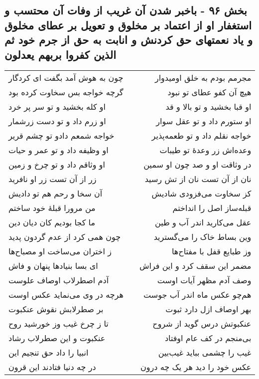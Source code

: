 \begin{center}
\section*{بخش ۹۶ - باخبر شدن آن غریب از وفات آن محتسب و استغفار او از اعتماد بر مخلوق و تعویل بر عطای مخلوق و یاد نعمتهای حق کردنش و انابت به حق از جرم خود ثم الذین کفروا بربهم یعدلون}
\label{sec:sh096}
\begin{longtable}{l p{0.5cm} r}
چون به هوش آمد بگفت ای کردگار
&&
مجرمم بودم به خلق اومیدوار
\\
گرچه خواجه بس سخاوت کرده بود
&&
هیچ آن کفو عطای تو نبود
\\
او کله بخشید و تو سر پر خرد
&&
او قبا بخشید و تو بالا و قد
\\
او زرم داد و تو دست زرشمار
&&
او ستورم داد و تو عقل سوار
\\
خواجه شمعم دادو تو چشم قریر
&&
خواجه نقلم داد و تو طعمه‌پذیر
\\
او وظیفه داد و تو عمر و حیات
&&
وعده‌اش زر وعدهٔ تو طیبات
\\
او وثاقم داد و تو چرخ و زمین
&&
در وثاقت او و صد چون او سمین
\\
زر از آن تست زر او نافرید
&&
نان از آن تست نان از تش رسید
\\
آن سخا و رحم هم تو دادیش
&&
کز سخاوت می‌فزودی شادیش
\\
من مرورا قبلهٔ خود ساختم
&&
قبله‌ساز اصل را انداختم
\\
ما کجا بودیم کان دیان دین
&&
عقل می‌کارید اندر آب و طین
\\
چون همی کرد از عدم گردون پدید
&&
وین بساط خاک را می‌گسترید
\\
ز اختران می‌ساخت او مصباح‌ها
&&
وز طبایع قفل با مفتاح‌ها
\\
ای بسا بنیادها پنهان و فاش
&&
مضمر این سقف کرد و این فراش
\\
آدم اصطرلاب اوصاف علوست
&&
وصف آدم مظهر آیات اوست
\\
هرچه در وی می‌نماید عکس اوست
&&
هم‌چو عکس ماه اندر آب جوست
\\
بر صطرلابش نقوش عنکبوت
&&
بهر اوصاف ازل دارد ثبوت
\\
تا ز چرخ غیب وز خورشید روح
&&
عنکبوتش درس گوید از شروح
\\
عنکبوت و این صطرلاب رشاد
&&
بی‌منجم در کف عام اوفتاد
\\
انبیا را داد حق تنجیم این
&&
غیب را چشمی بباید غیب‌بین
\\
در چه دنیا فتادند این قرون
&&
عکس خود را دید هر یک چه درون
\\

\end{longtable}
\end{center}
